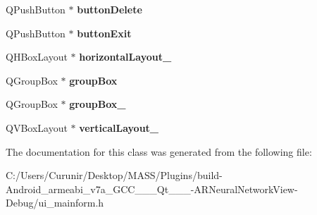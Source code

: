 \begin{DoxyCompactItemize}
Q\+Push\+Button $\ast$ {\bfseries button\+Delete}
\item 
\mbox{\label{class_ui___main_form_afbec44e91b63d7971a47b691b91554cc}} 
Q\+Push\+Button $\ast$ {\bfseries button\+Exit}
\item 
\mbox{\label{class_ui___main_form_a804c1b18fa67534ff690bf4080d74a0c}} 
Q\+H\+Box\+Layout $\ast$ {\bfseries horizontal\+Layout\+\_}
\item 
\mbox{\label{class_ui___main_form_a5e3341a8e81ff0b77f71dc556b44cd18}} 
Q\+Group\+Box $\ast$ {\bfseries group\+Box}
\item 
\mbox{\label{class_ui___main_form_a3f1ff515b4e56032f8ac761696eded34}} 
Q\+Group\+Box $\ast$ {\bfseries group\+Box\+\_}
\item 
\mbox{\label{class_ui___main_form_af65604389938e91ad8d0725123095009}} 
Q\+V\+Box\+Layout $\ast$ {\bfseries vertical\+Layout\+\_}
\end{DoxyCompactItemize}


The documentation for this class was generated from the following file\+:\begin{DoxyCompactItemize}
\item 
C\+:/\+Users/\+Curunir/\+Desktop/\+M\+A\+S\+S/\+Plugins/build-\/\+Android\+\_\+armeabi\+\_\+v7a\+\_\+\+G\+C\+C\+\_\+\_\+\_\+\+Qt\+\_\+\_\+\_-\/\+A\+R\+Neural\+Network\+View-\/\+Debug/ui\+\_\+mainform.\+h\end{DoxyCompactItemize}
